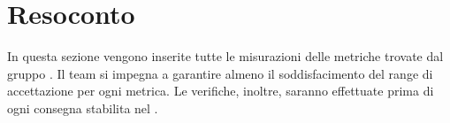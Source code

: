 \section{Resoconto}

In questa sezione vengono inserite tutte le misurazioni delle metriche trovate dal gruppo \gruppo.
Il team si impegna a garantire almeno il soddisfacimento del range di accettazione per ogni metrica. Le verifiche, inoltre, saranno effettuate prima di ogni consegna stabilita nel \PdP.